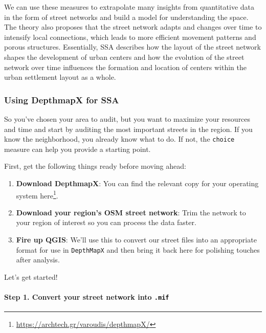 \documentclass[
]{latex/krantz}
\renewcommand{\href}[2]{#2\footnote{\url{#1}}}
\DeclareRobustCommand{\href}[2]{#2\footnote{\url{#1}}}
\begin{document}
We can use these measures to extrapolate many insights from quantitative data in the form of street networks and build a model for understanding the space. The theory also proposes that the street network adapts and changes over time to intensify local connections, which leads to more efficient movement patterns and porous structures. Essentially, SSA describes how the layout of the street network shapes the development of urban centers and how the evolution of the street network over time influences the formation and location of centers within the urban settlement layout as a whole.

\hypertarget{using-depthmapx}{%
\subsubsection{Using DepthmapX for SSA}\label{using-depthmapx}}

So you've chosen your area to audit, but you want to maximize your resources and time and start by auditing the most important streets in the region. If you know the neighborhood, you already know what to do. If not, the \texttt{choice} measure can help you provide a starting point.

First, get the following things ready before moving ahead:

\begin{enumerate}
\def\labelenumi{\arabic{enumi}.}
\item
  \textbf{Download DepthmapX}: You can find the relevant copy for your operating system \href{https://archtech.gr/varoudis/depthmapX/}{here}.
\item
  \textbf{Download your region's OSM street network}: Trim the network to your region of interest so you can process the data faster.
\item
  \textbf{Fire up QGIS}: We'll use this to convert our street files into an appropriate format for use in \texttt{DepthMapX} and then bring it back here for polishing touches after analysis.
\end{enumerate}

Let's get started!

\hypertarget{step-1.-convert-your-street-network-into-.mif}{%
\paragraph*{\texorpdfstring{Step 1. Convert your street network into \texttt{.mif}}{Step 1. Convert your street network into .mif}}\label{step-1.-convert-your-street-network-into-.mif}}
\end{document}
